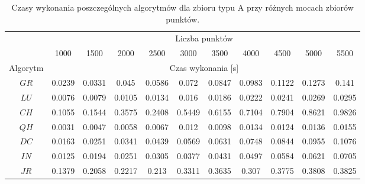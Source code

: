 \documentclass[11pt]{article}
\theoremstyle{remark} \newtheorem{definition}{def.}
\theoremstyle{definition} \newtheorem{twierdzenie}{tw.}
\begin{document}
\begin{table}[]
\centering
\caption{Czasy wykonania poszczególnych algorytmów dla zbioru typu A przy różnych mocach zbiorów punktów.}
\label{tab:chmura}
\begin{tabular}{c|c|c|c|c|c|c|c|c|c|c|}
\cline{2-11}
\multicolumn{1}{l|}{} & \multicolumn{10}{c|}{Liczba punktów} \\ \cline{2-11} 
\multicolumn{1}{l|}{} & 1000 & 1500 & 2000 & 2500 & 3000 & 3500 & 4000 & 4500 & 5000 & 5500 \\ \hline
\multicolumn{1}{|c|}{Algorytm} & \multicolumn{10}{c|}{Czas wykonania {[}s{]}} \\ \hline
\multicolumn{1}{|c|}{$GR$} & 0.0239 & 0.0331 & 0.045 & 0.0586 & 0.072 & 0.0847 & 0.0983 & 0.1122 & 0.1273 & 0.141 \\ \hline
\multicolumn{1}{|c|}{$LU$} & 0.0076 & 0.0079 & 0.0105 & 0.0134 & 0.016 & 0.0186 & 0.0222 & 0.0241 & 0.0269 & 0.0295 \\ \hline
\multicolumn{1}{|c|}{$CH$} & 0.1055 & 0.1544 & 0.3575 & 0.2408 & 0.5449 & 0.6155 & 0.7104 & 0.7904 & 0.8621 & 0.9826 \\ \hline
\multicolumn{1}{|c|}{$QH$} & 0.0031 & 0.0047 & 0.0058 & 0.0067 & 0.012 & 0.0098 & 0.0134 & 0.0124 & 0.0136 & 0.0155 \\ \hline
\multicolumn{1}{|c|}{$DC$} & 0.0163 & 0.0251 & 0.0341 & 0.0439 & 0.0569 & 0.0631 & 0.0748 & 0.0844 & 0.0955 & 0.1076 \\ \hline
\multicolumn{1}{|c|}{$IN$} & 0.0125 & 0.0194 & 0.0251 & 0.0305 & 0.0377 & 0.0431 & 0.0497 & 0.0584 & 0.0621 & 0.0705 \\ \hline
\multicolumn{1}{|c|}{$JR$} & 0.1379 & 0.2058 & 0.2217 & 0.213 & 0.3311 & 0.3635 & 0.307 & 0.3775 & 0.3808 & 0.3825 \\ \hline
\end{tabular}
\end{table}
\end{document}
